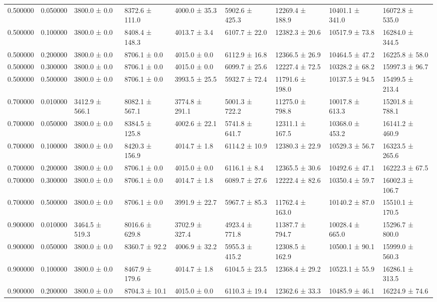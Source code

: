 \begin{table}
\begin{tabular}{rrlllllll}
0.500000 & 0.050000 & 3800.0 ± 0.0 & 8372.6 ± 111.0 & 4000.0 ± 35.3 & 5902.6 ± 425.3 & 12269.4 ± 188.9 & 10401.1 ± 341.0 & 16072.8 ± 535.0 \\
0.500000 & 0.100000 & 3800.0 ± 0.0 & 8408.4 ± 148.3 & 4013.7 ± 3.4 & 6107.7 ± 22.0 & 12382.3 ± 20.6 & 10517.9 ± 73.8 & 16284.0 ± 344.5 \\
0.500000 & 0.200000 & 3800.0 ± 0.0 & 8706.1 ± 0.0 & 4015.0 ± 0.0 & 6112.9 ± 16.8 & 12366.5 ± 26.9 & 10464.5 ± 47.2 & 16225.8 ± 58.0 \\
0.500000 & 0.300000 & 3800.0 ± 0.0 & 8706.1 ± 0.0 & 4015.0 ± 0.0 & 6099.7 ± 25.6 & 12227.4 ± 72.5 & 10328.2 ± 68.2 & 15997.3 ± 96.7 \\
0.500000 & 0.500000 & 3800.0 ± 0.0 & 8706.1 ± 0.0 & 3993.5 ± 25.5 & 5932.7 ± 72.4 & 11791.6 ± 198.0 & 10137.5 ± 94.5 & 15499.5 ± 213.4 \\
0.700000 & 0.010000 & 3412.9 ± 566.1 & 8082.1 ± 567.1 & 3774.8 ± 291.1 & 5001.3 ± 722.2 & 11275.0 ± 798.8 & 10017.8 ± 613.3 & 15201.8 ± 788.1 \\
0.700000 & 0.050000 & 3800.0 ± 0.0 & 8384.5 ± 125.8 & 4002.6 ± 22.1 & 5741.8 ± 641.7 & 12311.1 ± 167.5 & 10368.0 ± 453.2 & 16141.2 ± 460.9 \\
0.700000 & 0.100000 & 3800.0 ± 0.0 & 8420.3 ± 156.9 & 4014.7 ± 1.8 & 6114.2 ± 10.9 & 12380.3 ± 22.9 & 10529.3 ± 56.7 & 16323.5 ± 265.6 \\
0.700000 & 0.200000 & 3800.0 ± 0.0 & 8706.1 ± 0.0 & 4015.0 ± 0.0 & 6116.1 ± 8.4 & 12365.5 ± 30.6 & 10492.6 ± 47.1 & 16222.3 ± 67.5 \\
0.700000 & 0.300000 & 3800.0 ± 0.0 & 8706.1 ± 0.0 & 4014.7 ± 1.8 & 6089.7 ± 27.6 & 12222.4 ± 82.6 & 10350.4 ± 59.7 & 16002.3 ± 106.7 \\
0.700000 & 0.500000 & 3800.0 ± 0.0 & 8706.1 ± 0.0 & 3991.9 ± 22.7 & 5967.7 ± 85.3 & 11762.4 ± 163.0 & 10140.2 ± 87.0 & 15510.1 ± 170.5 \\
0.900000 & 0.010000 & 3464.5 ± 519.3 & 8016.6 ± 629.8 & 3702.9 ± 327.4 & 4923.4 ± 771.8 & 11387.7 ± 794.7 & 10028.4 ± 665.0 & 15296.7 ± 800.0 \\
0.900000 & 0.050000 & 3800.0 ± 0.0 & 8360.7 ± 92.2 & 4006.9 ± 32.2 & 5955.3 ± 415.2 & 12308.5 ± 162.9 & 10500.1 ± 90.1 & 15999.0 ± 560.3 \\
0.900000 & 0.100000 & 3800.0 ± 0.0 & 8467.9 ± 179.6 & 4014.7 ± 1.8 & 6104.5 ± 23.5 & 12368.4 ± 29.2 & 10523.1 ± 55.9 & 16286.1 ± 313.5 \\
0.900000 & 0.200000 & 3800.0 ± 0.0 & 8704.3 ± 10.1 & 4015.0 ± 0.0 & 6110.3 ± 19.4 & 12362.6 ± 33.3 & 10485.9 ± 46.1 & 16224.9 ± 74.6 \\

\end{tabular}
\end{table}
